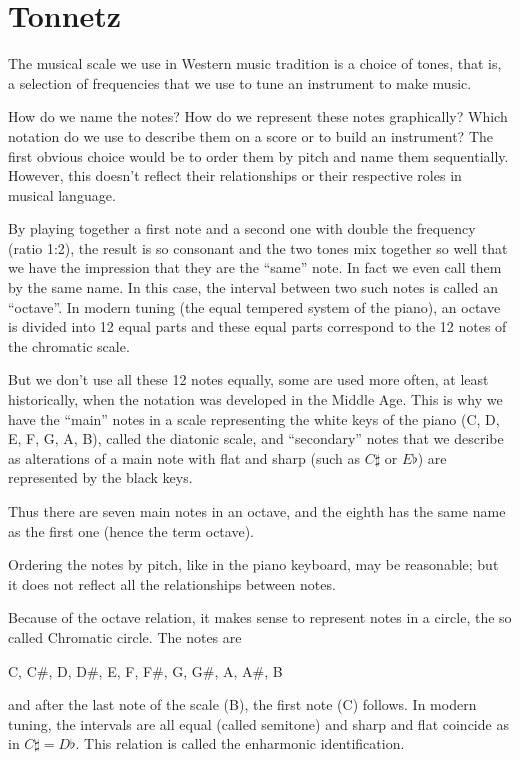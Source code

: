 \section{Tonnetz}

The musical scale we use in Western music tradition is a choice of tones, that is, a selection of frequencies that we use to tune an instrument to make music.

How do we name the notes? How do we represent these notes graphically? Which notation do we use to describe them on a score or to build an instrument? The first obvious choice would be to order them by pitch and name them sequentially. However, this doesn't reflect their relationships or their respective roles in musical language.

By playing together a first note and a second one with double the frequency (ratio 1:2), the result is so consonant and the two tones mix together so well that we have the impression that they are the ``same'' note. In fact we even call them by the same name. In this case, the interval between two such notes is called an ``octave''. In modern tuning (the equal tempered system of the piano), an octave is divided into 12 equal parts and these equal parts correspond to the 12 notes of the chromatic scale.

But we don't use all these 12 notes equally, some are used more often, at least historically, when the notation was developed in the Middle Age. This is why we have the ``main'' notes in a scale representing the white keys of the piano (C, D, E, F, G, A, B), called the diatonic scale, and ``secondary'' notes that we describe as alterations of a main note with flat and sharp (such as $C\sharp$ or $E\flat$) are represented by the black keys.

Thus there are seven main notes in an octave, and the eighth has the same name as the first one (hence the term octave).

Ordering the notes by pitch, like in the piano keyboard, may be reasonable; but it does not reflect all the relationships between notes. 

Because of the octave relation, it makes sense to represent notes in a circle, the so called Chromatic circle. The notes are

C, C\#, D, D\#, E, F, F\#, G, G\#, A, A\#, B

and after the last note of the scale (B), the first note (C) follows. In modern tuning, the intervals are all equal (called semitone) and sharp and flat coincide as in $C\sharp = D\flat$. This relation is called the enharmonic identification. 

